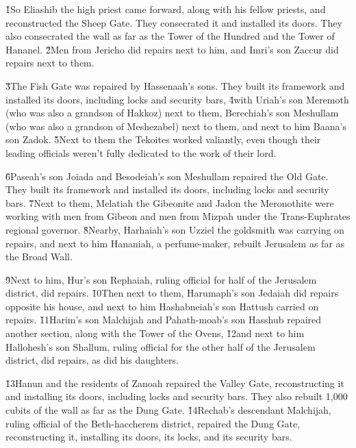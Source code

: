 \v{1}So Eliashib the high priest came forward, along with his fellow priests, and reconstructed the Sheep Gate. They consecrated it and installed its doors. They also consecrated the wall as far as the Tower of the Hundred and the Tower of Hananel. \v{2}Men from Jericho did repairs next to him, and Imri's son Zaccur did repairs next to them.

\v{3}The Fish Gate was repaired by Hassenaah's sons. They built its framework and installed its doors, including locks and security bars, \v{4}with Uriah's son Meremoth (who was also a grandson of Hakkoz) next to them, Berechiah's son Meshullam (who was also a grandson of Meshezabel) next to them, and next to him Baana's son Zadok. \v{5}Next to them the Tekoites worked valiantly, even though their leading officials weren't fully dedicated to the work of their lord.

\v{6}Paseah's son Joiada and Besodeiah's son Meshullam repaired the Old Gate. They built its framework and installed its doors, including locks and security bars. \v{7}Next to them, Melatiah the Gibeonite and Jadon the Meronothite were working with men from Gibeon and men from Mizpah under the Trans-Euphrates regional governor. \v{8}Nearby, Harhaiah's son Uzziel the goldsmith was carrying on repairs, and next to him Hananiah, a perfume-maker, rebuilt Jerusalem as far as the Broad Wall.

\v{9}Next to him, Hur's son Rephaiah, ruling official for half of the Jerusalem district, did repairs. \v{10}Then next to them, Harumaph's son Jedaiah did repairs opposite his house, and next to him Hashabneiah's son Hattush carried on repairs. \v{11}Harim's son Malchijah and Pahath-moab's son Hasshub repaired another section, along with the Tower of the Ovens, \v{12}and next to him Hallohesh's son Shallum, ruling official for the other half of the Jerusalem district, did repairs, as did his daughters.

\v{13}Hanun and the residents of Zanoah repaired the Valley Gate, reconstructing it and installing its doors, including locks and security bars. They also rebuilt 1,000 cubits of the wall as far as the Dung Gate. \v{14}Rechab's descendant Malchijah, ruling official of the Beth-haccherem district, repaired the Dung Gate, reconstructing it, installing its doors, its locks, and its security bars.

